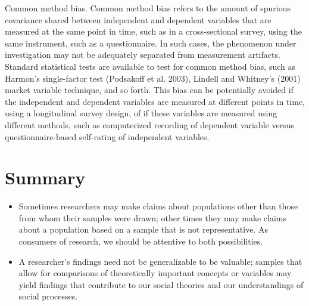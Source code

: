 Common method bias. Common method bias refers to the amount of spurious covariance shared between independent and dependent variables that are measured at the same point in time, such as in a cross-sectional survey, using the same instrument, such as a questionnaire. In such cases, the phenomenon under investigation may not be adequately separated from measurement artifacts. Standard statistical tests are available to test for common method bias, such as Harmon’s single-factor test (Podsakoff et al. 2003), Lindell and Whitney’s (2001) market variable technique, and so forth. This bias can be potentially avoided if the independent and dependent variables are measured at different points in time, using a longitudinal survey design, of if these variables are measured using different methods, such as computerized recording of dependent variable versus questionnaire-based self-rating of independent variables.

\section{Summary}\label{08:summary}

\begin{itemize}
	\setlength{\itemsep}{0pt}
	\setlength{\parskip}{0pt}
	\setlength{\parsep}{0pt}
	
	\item Sometimes researchers may make claims about populations other than those from whom their samples were drawn; other times they may make claims about a population based on a sample that is not representative. As consumers of research, we should be attentive to both possibilities.
	\item A researcher’s findings need not be generalizable to be valuable; samples that allow for comparisons of theoretically important concepts or variables may yield findings that contribute to our social theories and our understandings of social processes.
	
\end{itemize}
